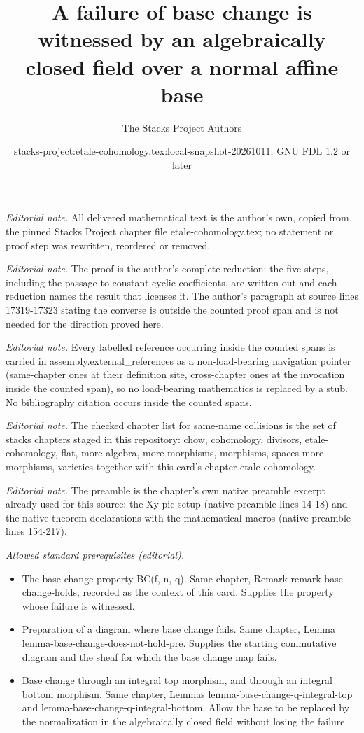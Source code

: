 \documentclass[10pt,a4paper]{amsart}
\title{A failure of base change is witnessed by an algebraically closed field over a normal affine base}
\author{The Stacks Project Authors}
\date{stacks-project:etale-cohomology.tex:local-snapshot-20261011; GNU FDL 1.2 or later}
\theoremstyle{plain}
\theoremstyle{definition}
\theoremstyle{remark}
\numberwithin{equation}{subsection}
\begin{document}
\maketitle
\noindent\textit{Editorial note.} All delivered mathematical text is the author's own, copied from the pinned Stacks Project chapter file etale-cohomology.tex; no statement or proof step was rewritten, reordered or removed.\par\medskip
\noindent\textit{Editorial note.} The proof is the author's complete reduction: the five steps, including the passage to constant cyclic coefficients, are written out and each reduction names the result that licenses it. The author's paragraph at source lines 17319-17323 stating the converse is outside the counted proof span and is not needed for the direction proved here.\par\medskip
\noindent\textit{Editorial note.} Every labelled reference occurring inside the counted spans is carried in assembly.external\_references as a non-load-bearing navigation pointer (same-chapter ones at their definition site, cross-chapter ones at the invocation inside the counted span), so no load-bearing mathematics is replaced by a stub. No bibliography citation occurs inside the counted spans.\par\medskip
\noindent\textit{Editorial note.} The checked chapter list for same-name collisions is the set of stacks chapters staged in this repository: chow, cohomology, divisors, etale-cohomology, flat, more-algebra, more-morphisms, morphisms, spaces-more-morphisms, varieties together with this card's chapter etale-cohomology.\par\medskip
\noindent\textit{Editorial note.} The preamble is the chapter's own native preamble excerpt already used for this source: the Xy-pic setup (native preamble lines 14-18) and the native theorem declarations with the mathematical macros (native preamble lines 154-217).\par\medskip
\noindent\textit{Allowed standard prerequisites (editorial).}\begin{itemize}
\item The base change property BC(f, n, q). Same chapter, Remark remark-base-change-holds, recorded as the context of this card. Supplies the property whose failure is witnessed.
\item Preparation of a diagram where base change fails. Same chapter, Lemma lemma-base-change-does-not-hold-pre. Supplies the starting commutative diagram and the sheaf for which the base change map fails.
\item Base change through an integral top morphism, and through an integral bottom morphism. Same chapter, Lemmas lemma-base-change-q-integral-top and lemma-base-change-q-integral-bottom. Allow the base to be replaced by the normalization in the algebraically closed field without losing the failure.
\end{itemize}\medskip
\end{document}
